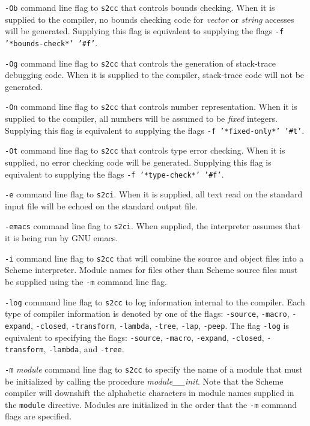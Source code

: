 \documentclass[10pt,twocolumn]{article}
\begin{document}
\texttt{-Ob} command line flag to \texttt{s2cc} that controls bounds
checking.  When it is supplied to the compiler, no bounds checking
code for \emph{vector} or \emph{string} accesses will be generated.
Supplying this flag is equivalent to supplying the flags \texttt{-f
  '*bounds-check*' '\#f'}.

\texttt{-Og} command line flag to \texttt{s2cc} that controls the
generation of stack-trace debugging code. When it is supplied to the
compiler, stack-trace code will not be generated.

\texttt{-On} command line flag to \texttt{s2cc} that controls number
representation. When it is supplied to the compiler, all numbers will
be assumed to be \emph{fixed} integers.  Supplying this flag is
equivalent to supplying the flags \texttt{-f '*fixed-only*' '\#t'}.

\texttt{-Ot} command line flag to \texttt{s2cc} that controls type
error checking. When it is supplied, no error checking code will be
generated. Supplying this flag is equivalent to supplying the flags
\texttt{-f '*type-check*' '\#f'}.

\texttt{-e} command line flag to \texttt{s2ci}.  When it is supplied,
all text read on the standard input file will be echoed on the
standard output file.

\texttt{-emacs} command line flag to \texttt{s2ci}.  When supplied, the
interpreter assumes that it is being run by GNU emacs.

\texttt{-i} command line flag to \texttt{s2cc} that will combine the
source and object files into a Scheme interpreter.  Module names for
files other than Scheme source files must be supplied using the
\texttt{-m} command line flag.

\texttt{-log} command line flag to \texttt{s2cc} to log information
internal to the compiler.  Each type of compiler information is
denoted by one of the flags: \texttt{-source}, \texttt{-macro},
\texttt{-expand}, \texttt{-closed}, \texttt{-transform},
\texttt{-lambda}, \texttt{-tree}, \texttt{-lap}, \texttt{-peep}.  The
flag \texttt{-log} is equivalent to specifying the flags:
\texttt{-source}, \texttt{-macro}, \texttt{-expand}, \texttt{-closed},
\texttt{-transform}, \texttt{-lambda}, and \texttt{-tree}.

\texttt{-m} \emph{module} command line flag to \texttt{s2cc} to specify
the name of a module that must be initialized by calling the procedure
\emph{module\_\_init}.  Note that the Scheme compiler will downshift
the alphabetic characters in module names supplied in the
\texttt{module} directive.  Modules are initialized in the order that
the \texttt{-m} command flags are specified.
\end{document}
